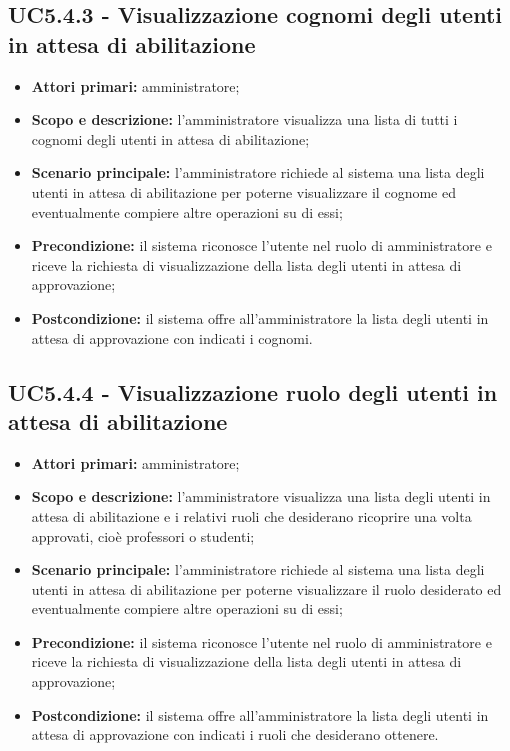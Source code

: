\documentclass[AnalisiDeiRequisiti.tex]{subfiles}
\begin{document}
\subsection{UC5.4.3 - Visualizzazione cognomi degli utenti in attesa di abilitazione}
\begin{itemize}
	\item \textbf{Attori primari:} amministratore;
	\item \textbf{Scopo e descrizione:} l'amministratore visualizza una lista di tutti i cognomi degli utenti in attesa di abilitazione;
	\item \textbf{Scenario principale:} l'amministratore richiede al sistema una lista degli utenti in attesa di abilitazione per poterne visualizzare il cognome ed eventualmente compiere altre operazioni su di essi;
	\item \textbf{Precondizione:} il sistema riconosce l'utente nel ruolo di amministratore e riceve la richiesta di visualizzazione della lista degli utenti in attesa di approvazione;
	\item \textbf{Postcondizione:} il sistema offre all'amministratore la lista degli utenti in attesa di approvazione con indicati i cognomi.
\end{itemize}
\subsection{UC5.4.4 - Visualizzazione ruolo degli utenti in attesa di abilitazione}
\begin{itemize}
	\item \textbf{Attori primari:} amministratore;
	\item \textbf{Scopo e descrizione:} l'amministratore visualizza una lista degli utenti in attesa di abilitazione e i relativi ruoli che desiderano ricoprire una volta approvati, cioè professori o studenti;
	\item \textbf{Scenario principale:} l'amministratore richiede al sistema una lista degli utenti in attesa di abilitazione per poterne visualizzare il ruolo desiderato ed eventualmente compiere altre operazioni su di essi;
	\item \textbf{Precondizione:} il sistema riconosce l'utente nel ruolo di amministratore e riceve la richiesta di visualizzazione della lista degli utenti in attesa di approvazione;
	\item \textbf{Postcondizione:} il sistema offre all'amministratore la lista degli utenti in attesa di approvazione con indicati i ruoli che desiderano ottenere.
\end{itemize}
\end{document}
